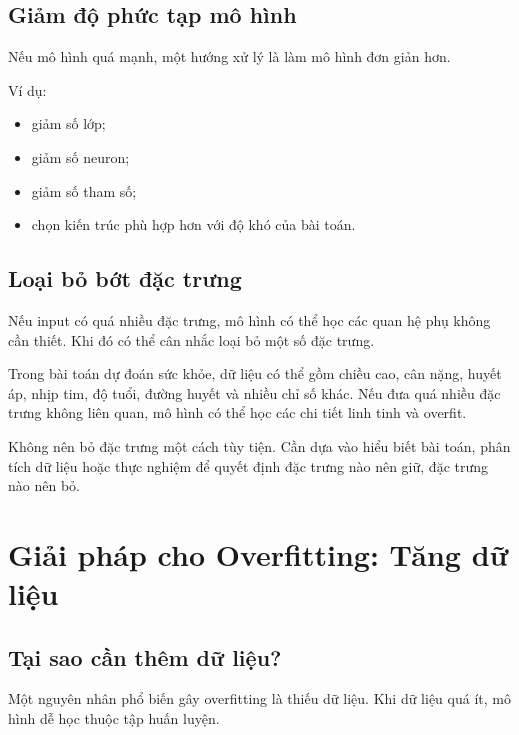 \subsection{Giảm độ phức tạp mô hình}

Nếu mô hình quá mạnh, một hướng xử lý là làm mô hình đơn giản hơn.

Ví dụ:

\begin{itemize}
    \item giảm số lớp;
    \item giảm số neuron;
    \item giảm số tham số;
    \item chọn kiến trúc phù hợp hơn với độ khó của bài toán.
\end{itemize}

\subsection{Loại bỏ bớt đặc trưng}

Nếu input có quá nhiều đặc trưng, mô hình có thể học các quan hệ phụ không cần thiết. Khi đó có thể cân nhắc loại bỏ một số đặc trưng.

\begin{vidu}
Trong bài toán dự đoán sức khỏe, dữ liệu có thể gồm chiều cao, cân nặng, huyết áp, nhịp tim, độ tuổi, đường huyết và nhiều chỉ số khác. Nếu đưa quá nhiều đặc trưng không liên quan, mô hình có thể học các chi tiết linh tinh và overfit.
\end{vidu}

\begin{luuy}
Không nên bỏ đặc trưng một cách tùy tiện. Cần dựa vào hiểu biết bài toán, phân tích dữ liệu hoặc thực nghiệm để quyết định đặc trưng nào nên giữ, đặc trưng nào nên bỏ.
\end{luuy}

\section{Giải pháp cho Overfitting: Tăng dữ liệu}

\subsection{Tại sao cần thêm dữ liệu?}

Một nguyên nhân phổ biến gây overfitting là thiếu dữ liệu. Khi dữ liệu quá ít, mô hình dễ học thuộc tập huấn luyện.


